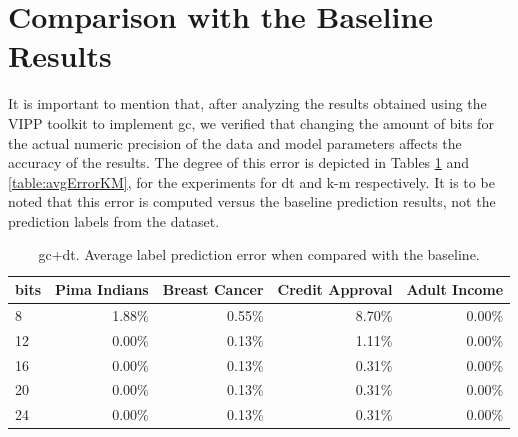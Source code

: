 \section{Comparison with the Baseline Results}
\label{sec:ExperimentalResultsComparisonBaseline}


It is important to mention that, after analyzing the results obtained using the VIPP toolkit to implement \ac{gc}, we verified that changing the amount of bits for the actual numeric precision of the data and model parameters affects the accuracy of the results. The degree of this error is depicted in Tables \ref{table:avgErrorDT} and \ref{table:avgErrorKM}, for the experiments for \ac{dt} and \ac{k-m} respectively. It is to be noted that this error is computed versus the baseline prediction results, not the prediction labels from the dataset. 

\begin{table}[htp]
\centering
\caption{\acs{gc}+\acs{dt}. Average label prediction error when compared with the baseline.}
\label{table:avgErrorDT}
\vspace*{0.2cm}
\begin{tabular}{|l|r|r|r|r|}
\hline
\textbf{bits} & \textbf{Pima Indians} & \textbf{Breast Cancer} & \textbf{Credit Approval} & \textbf{Adult Income} \\ \hline
8    & 1.88\%       & 0.55\%        & 8.70\%          & 0.00\%       \\ \hline
12   & 0.00\%       & 0.13\%        & 1.11\%          & 0.00\%       \\ \hline
16   & 0.00\%       & 0.13\%        & 0.31\%          & 0.00\%       \\ \hline
20   & 0.00\%       & 0.13\%        & 0.31\%          & 0.00\%       \\ \hline
24   & 0.00\%       & 0.13\%        & 0.31\%          & 0.00\%       \\ \hline
\end{tabular}
\end{table}

